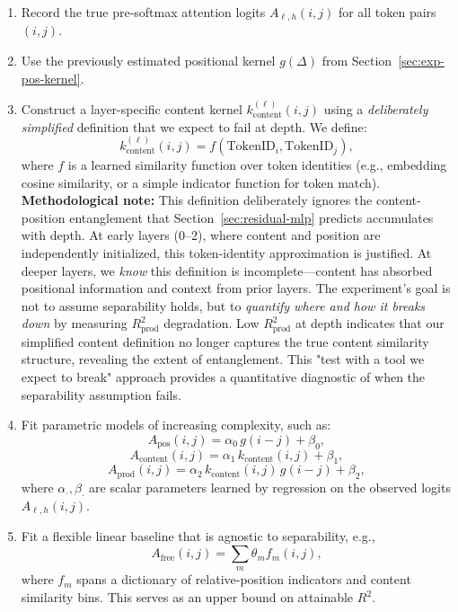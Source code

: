 \documentclass[11pt]{article}
\theoremstyle{definition}
\begin{document}
\begin{enumerate}
    \item Record the true pre-softmax attention logits \(A_{\ell,h}(i,j)\) for all token pairs \((i,j)\).
    \item Use the previously estimated positional kernel \(g(\Delta)\) from Section~\ref{sec:exp-pos-kernel}.
    \item Construct a layer-specific content kernel \(k_{\text{content}}^{(\ell)}(i,j)\) using a \emph{deliberately simplified} definition that we expect to fail at depth. We define:
    \[
      k_{\text{content}}^{(\ell)}(i,j) = f(\text{TokenID}_i, \text{TokenID}_j),
    \]
    where $f$ is a learned similarity function over token identities (e.g., embedding cosine similarity, or a simple indicator function for token match). \textbf{Methodological note:} This definition deliberately ignores the content-position entanglement that Section~\ref{sec:residual-mlp} predicts accumulates with depth. At early layers (0--2), where content and position are independently initialized, this token-identity approximation is justified. At deeper layers, we \emph{know} this definition is incomplete---content has absorbed positional information and context from prior layers. The experiment's goal is not to assume separability holds, but to \emph{quantify where and how it breaks down} by measuring $R^2_{\text{prod}}$ degradation. Low $R^2_{\text{prod}}$ at depth indicates that our simplified content definition no longer captures the true content similarity structure, revealing the extent of entanglement. This "test with a tool we expect to break" approach provides a quantitative diagnostic of when the separability assumption fails.
    \item Fit parametric models of increasing complexity, such as:
    \[
      A_{\text{pos}}(i,j) = \alpha_0\, g(i-j) + \beta_0,
    \]
    \[
      A_{\text{content}}(i,j) = \alpha_1\, k_{\text{content}}(i,j) + \beta_1,
    \]
    \[
      A_{\text{prod}}(i,j) = \alpha_2\, k_{\text{content}}(i,j)\,g(i-j) + \beta_2,
    \]
    where \(\alpha_{\cdot}, \beta_{\cdot}\) are scalar parameters learned by regression on the observed logits \(A_{\ell,h}(i,j)\).
    \item Fit a flexible linear baseline that is agnostic to separability, e.g.,
    \[
      A_{\text{free}}(i,j) = \sum_{m} \theta_m f_m(i,j),
    \]
    where \(f_m\) spans a dictionary of relative-position indicators and content similarity bins. This serves as an upper bound on attainable \(R^2\).
\end{enumerate}
\end{document}
